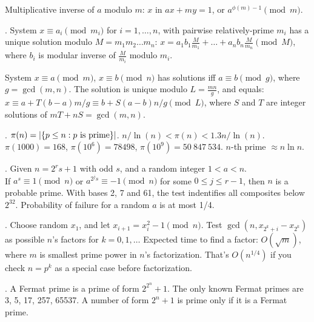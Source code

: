 Multiplicative inverse of $a$ modulo $m$:
$x$ in $ax + my = 1$, or $a^{\phi(m)-1} \pmod{m}$.

.
System $x \equiv a_i \pmod{m_i}$ for $i=1,\dots,n$, with
pairwise relatively-prime $m_i$ has a unique solution modulo $M = m_1 m_2 \dots m_n$:
$x = a_1 b_1 \frac{M}{m_1} + \dots + a_n b_n \frac{M}{m_n} \pmod{M}$,
where $b_i$ is modular inverse of $\frac{M}{m_i}$ modulo $m_i$.

System $x \equiv a \pmod{m}$, $x \equiv b \pmod{n}$ has solutions
iff $a \equiv b \pmod{g}$, where $g=\gcd(m,n)$.
The solution is unique modulo $L=\frac{mn}{g}$, and equals:
$x \equiv a + T(b-a) m/g \equiv b + S(a-b) n/g \pmod{L}$,
where $S$ and $T$ are integer solutions of $mT + nS = \gcd(m,n)$.

. $\pi(n) = |\{p \le n : p \hbox{ is prime}\}|$.
$n/\ln(n) < \pi(n) < 1.3 n/\ln(n)$.
$\pi(1000) = 168$, $\pi(10^6) = 78498$, $\pi(10^9) = 50\ 847\ 534$.
\quad $n$-th prime $\approx n \ln n$.

.
Given $n = 2^r s + 1$ with odd $s$, and a random integer $1 < a < n$. \\
If $a^s \equiv 1 {\pmod n}$ or $a^{2^j s} \equiv -1 {\pmod n}$ for some
$0 \le j \le r-1$, then $n$ is a probable prime.
With bases 2, 7 and 61, the test indentifies all composites below $2^{32}$.
Probability of failure for a random $a$ is at most 1/4.

.
Choose random $x_1$, and let $x_{i+1} = x_i^2 - 1 \pmod{n}$.
Test $\gcd(n, x_{2^k+i} - x_{2^k})$ as possible $n$'s factors for $k=0,1,\ldots$
Expected time to find a factor: $O(\sqrt{m})$, where $m$ is smallest
prime power in $n$'s factorization.
That's $O(n^{1/4})$ if you check $n = p^k$ as a special case before factorization.

.  A Fermat prime is a prime of form $2^{2^n}+1$.
The only known Fermat primes are 3, 5, 17, 257, 65537.
A number of form $2^n+1$ is prime only if it is a Fermat prime.


